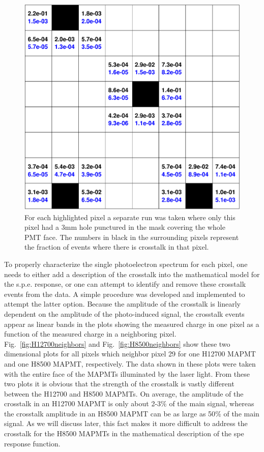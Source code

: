 \begin{figure}
	\centering
	\includegraphics[width=\linewidth]{figures/H12700_ct_ratio.png}
	\caption{For each highlighted pixel a separate run was taken where only this pixel had a 3mm hole punctured in the mask covering the whole PMT face. The numbers in black in the surrounding pixels represent the fraction of events where there is crosstalk in that pixel.}
	\label{fig:H12700_ct_ratio}
\end{figure}

To properly characterize the single photoelectron spectrum for each pixel, one needs to either add a description of the crosstalk into the mathematical model for the s.p.e. response, or one can attempt to identify and remove these crosstalk events from the data. A simple procedure was developed and implemented to attempt the latter option. Because the amplitude of the crosstalk is linearly dependent on the amplitude of the photo-induced signal, the crosstalk events appear as linear bands in the plots showing the measured charge in one pixel as a function of the measured charge in a neighboring pixel. Fig.~\ref{fig:H12700neighbors} and Fig.~\ref{fig:H8500neighbors} show these two dimensional plots for all pixels which neighbor pixel 29 for one H12700 MAPMT and one H8500 MAPMT, respectively. The data shown in these plots were taken with the entire face of the MAPMTs illuminated by the laser light. From these two plots it is obvious that the strength of the crosstalk is vastly different between the H12700 and H8500 MAPMTs. On average, the amplitude of the crosstalk in an H12700 MAPMT is only about 2-3$\%$ of the main signal, whereas the crosstalk amplitude in an H8500 MAPMT can be as large as 50$\%$ of the main signal. As we will discuss later, this fact makes it more difficult to address the crosstalk for the H8500 MAPMTs in the mathematical description of the spe response function.

